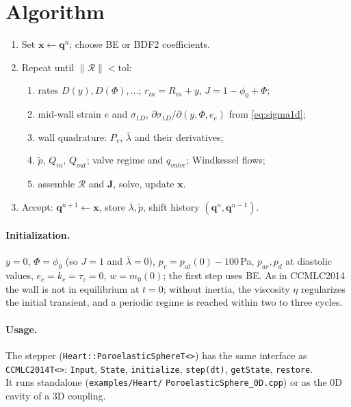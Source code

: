 \documentclass[11pt,a4paper]{article}
\newcommand{\Rin}{R_{in}}
\newcommand{\rin}{r_{in}}
\newcommand{\lb}{\bar\lambda}
\newcommand{\pf}{\tilde p}
\newcommand{\sig}{\sigma_{1D}}
\newcommand{\code}[1]{\texttt{#1}}
\begin{document}
\section{Algorithm}

\begin{tcolorbox}[title=One time step $t_n\to t_{n+1}$]
\begin{enumerate}[leftmargin=1.5em,itemsep=1pt]
\item Set $\mathbf x\leftarrow\mathbf q^n$; choose BE or BDF2 coefficients.
\item Repeat until $\|\mathcal R\|<\text{tol}$:
\begin{enumerate}[leftmargin=1.5em,itemsep=0pt]
\item rates $D(y),D(\Phi),\dots$; $\rin=\Rin+y$, $J=1-\phi_0+\Phi$;
\item mid-wall strain $e$ and $\sig$, $\partial\sig/\partial(y,\Phi,e_c)$ from \eqref{eq:sigma1d};
\item wall quadrature: $P_v$, $\lb$ and their derivatives;
\item $\pf$, $Q_{in}$, $Q_{out}$; valve regime and $q_{valve}$; Windkessel flows;
\item assemble $\mathcal R$ and $\mathbf J$, solve, update $\mathbf x$.
\end{enumerate}
\item Accept: $\mathbf q^{n+1}\leftarrow\mathbf x$, store $\lb,\pf$, shift history $(\mathbf q^{n},\mathbf q^{n-1})$.
\end{enumerate}
\end{tcolorbox}

\paragraph{Initialization.} $y=0$, $\Phi=\phi_0$ (so $J=1$ and $\lb=0$), $p_v=p_{at}(0)-100$\,Pa, $p_{ar},p_d$ at diastolic values, $e_c=k_c=\tau_c=0$, $w=m_0(0)$; the first step uses BE. As in CCMLC2014 the wall is not in equilibrium at $t=0$; without inertia, the viscosity $\eta$ regularizes the initial transient, and a periodic regime is reached within two to three cycles.

\paragraph{Usage.} The stepper (\code{Heart::PoroelasticSphereT<>}) has the same interface as \code{CCMLC2014T<>}: \code{Input}, \code{State}, \code{initialize}, \code{step(dt)}, \code{getState}, \code{restore}.\\ It runs standalone (\code{examples/Heart/} \code{PoroelasticSphere\_0D.cpp}) or as the 0D cavity of a 3D coupling.
\end{document}
